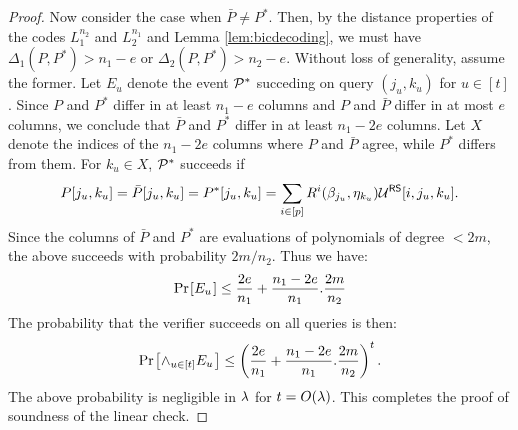 \begin{proof}
Now consider the case when $\bar{P}\neq P^\ast$. Then, by the distance
properties of the codes $L_1^{n_2}$ and $L_2^{n_1}$ and Lemma
\ref{lem:bicdecoding}, we must have $\Delta_1(P,P^\ast)>n_1-e$ or
$\Delta_2(P,P^\ast)>n_2-e$. Without loss of generality, assume the
former. Let $E_u$ denote the event $\mathcal{P}^\ast$ succeding on query $(j_u,k_u)$
for $u\in [t]$. Since $P$ and $P^\ast$ differ in at least $n_1-e$ columns
and $P$ and $\bar{P}$ differ in at most $e$ columns, we conclude that $\bar{P}$
and $P^\ast$ differ in at least $n_1-2e$ columns. Let $X$ denote the indices of
the $n_1-2e$ columns where $P$ and $\bar{P}$ agree, while $P^\ast$ differs from
them. For $k_u\in X$,  $\mathcal{P}^\ast$ succeeds if
$$P[j_u,k_u]=\bar{P}[j_u,k_u]=P^\ast[j_u,k_u]=\sum_{i\in
[p]}R^i(\beta_{j_u},\eta_{k_u})\mathcal{U}^{\mathsf{RS}}[i,j_u,k_u].$$
Since the columns of $\bar{P}$ and $P^\ast$ are evaluations of polynomials of
degree $<2m$, the above succeeds with probability $2m/n_2$. Thus we have:
\begin{align*}
\prob{E_u}\leq \frac{2e}{n_1}+\frac{n_1-2e}{n_1}.\frac{2m}{n_2}
\end{align*}
The probability that the verifier succeeds on all queries is then:
\begin{align}
\prob{\wedge_{u\in [t]}E_u}\leq
\left(\frac{2e}{n_1}+\frac{n_1-2e}{n_1}.\frac{2m}{n_2}\right)^t.
\end{align}
The above probability is negligible in $\lambda$ for $t=O(\lambda)$. This completes the
proof of soundness of the linear check.
\end{proof}

